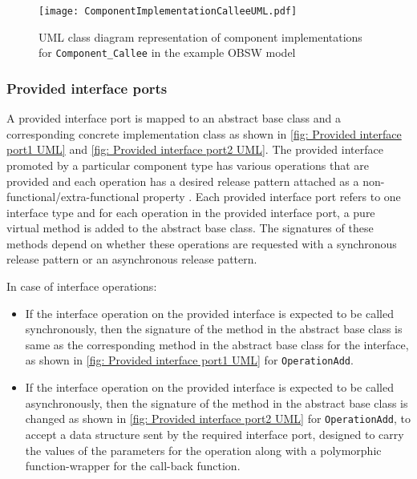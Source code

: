 \begin{figure}[h]
	\centering
	\texttt{[image: ComponentImplementationCalleeUML.pdf]}
	\caption{UML class diagram representation of component implementations for \texttt{Component\_\allowbreak Callee} in the example OBSW model}
	\label{fig: Component implementation Callee UML}
\end{figure}

\subsubsection{\textbf{Provided interface ports}}
A provided interface port is mapped to an abstract base class and a corresponding concrete implementation class as shown in \cref{fig: Provided interface port1 UML} and \cref{fig: Provided interface port2 UML}. The provided interface promoted by a particular component type has various operations that are provided and each operation has a desired release pattern attached as a non-functional/extra-functional property \cite{SpecMetamodel}\cite{CompBasedProcess}. Each provided interface port refers to one interface type and for each operation in the provided interface port, a pure virtual method is added to the abstract base class. The signatures of these methods depend on whether these operations are requested with a synchronous release pattern or an asynchronous release pattern.

\newpage
In case of interface operations:
\begin{itemize}
\item If the interface operation on the provided interface is expected to be called synchronously, then the signature of the method in the abstract base class is same as the corresponding method in the abstract base class for the interface, as shown in \cref{fig: Provided interface port1 UML} for \texttt{OperationAdd}.
\item If the interface operation on the provided interface is expected to be called asynchronously, then the signature of the method in the abstract base class is changed as shown in \cref{fig: Provided interface port2 UML} for \texttt{OperationAdd}, to accept a data structure sent by the required interface port, designed to carry the values of the parameters for the operation along with a polymorphic function-wrapper for the call-back function.     
\end{itemize}   

